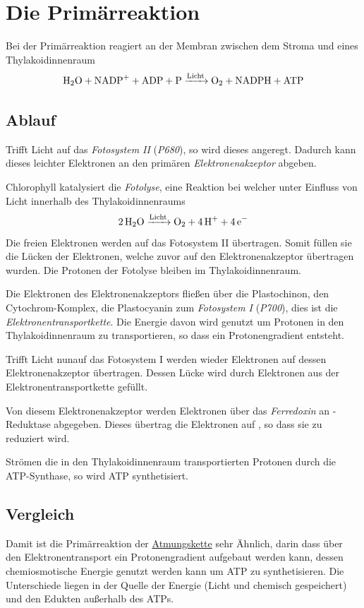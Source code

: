 \documentclass{article}
\begin{document}
\section{Die Primärreaktion}
Bei der Primärreaktion reagiert an der Membran zwischen dem Stroma und eines Thylakoidinnenraum
\[
 \ce{H2O + NADP+ + ADP + P ->[Licht] O2 + NADPH + ATP} 
\] 
 
\subsection{Ablauf} 
Trifft Licht auf das \emph{Fotosystem II} (\emph{P680}), so wird dieses angeregt. Dadurch kann dieses leichter Elektronen an den primären \emph{Elektronenakzeptor} abgeben.
 
Chlorophyll katalysiert die \emph{Fotolyse}, eine Reaktion bei welcher unter Einfluss von Licht innerhalb des Thylakoidinnenraums
\[
 \ce{2H2O ->[Licht] O2 + 4H+ + 4e-} 
\]
Die freien Elektronen werden auf das Fotosystem II übertragen. Somit füllen sie die Lücken der Elektronen, welche zuvor auf den Elektronenakzeptor übertragen wurden. Die Protonen der Fotolyse bleiben im Thylakoidinnenraum.
 
Die Elektronen des Elektronenakzeptors fließen über die Plastochinon, den Cytochrom-Komp\-lex, die Plastocyanin zum \emph{Fotosystem I} (\emph{P700}), dies ist die \emph{Elektronentransportkette}. Die Energie davon wird genutzt um Protonen in den Thylakoidinnenraum zu transportieren, so dass ein Protonengradient entsteht.
 
Trifft Licht nunauf das Fotosystem I werden wieder Elektronen auf dessen Elektronenakzeptor übertragen. Dessen Lücke wird durch Elektronen aus der Elektronentransportkette gefüllt.
 
Von diesem Elektronenakzeptor werden Elektronen über das \emph{Ferredoxin} an -Redukt\-ase abgegeben. Dieses übertrag die Elektronen auf , so dass sie zu  reduziert wird. 
 
Strömen die in den Thylakoidinnenraum transportierten Protonen durch die ATP-Synthase, so wird ATP synthetisiert.
 
\subsection{Vergleich} 
Damit ist die Primärreaktion der \hyperref[Die Atmungskette]{Atmungskette} sehr Ähnlich, darin dass über den Elektronentransport ein Protonengradient aufgebaut werden kann, dessen chemiosmotische Energie genutzt werden kann um ATP zu synthetisieren. Die Unterschiede liegen in der Quelle der Energie (Licht und chemisch gespeichert) und den Edukten außerhalb des ATPs.  
\end{document}
